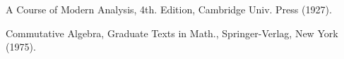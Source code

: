 \begin{sourcebibliography}
 A Course of Modern Analysis, 4th. Edition, Cambridge Univ. Press (1927).
\end{sourcebibliography}
\begin{sourcebibliography}
 Commutative Algebra, Graduate Texts in Math., Springer-Verlag, New York (1975).
\end{sourcebibliography}
